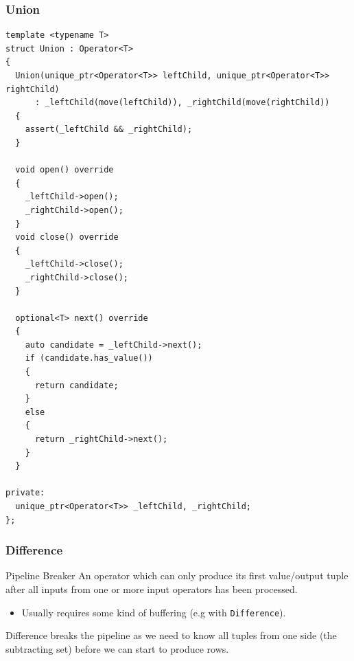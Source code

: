 \subsubsection{Union}
\begin{verbatim}
template <typename T>
struct Union : Operator<T>
{
  Union(unique_ptr<Operator<T>> leftChild, unique_ptr<Operator<T>> rightChild)
      : _leftChild(move(leftChild)), _rightChild(move(rightChild))
  {
    assert(_leftChild && _rightChild);
  }

  void open() override
  {
    _leftChild->open();
    _rightChild->open();
  }
  void close() override
  {
    _leftChild->close();
    _rightChild->close();
  }

  optional<T> next() override
  {
    auto candidate = _leftChild->next();
    if (candidate.has_value())
    {
      return candidate;
    }
    else
    {
      return _rightChild->next();
    }
  }

private:
  unique_ptr<Operator<T>> _leftChild, _rightChild;
};
\end{verbatim}

\subsubsection{Difference}

\begin{definitionbox}{Pipeline Breaker}
    An operator which can only produce its first value/output tuple after all inputs from one or more input operators has been processed.
    \begin{itemize}
        \item Usually requires some kind of buffering (e.g with \texttt{Difference}).
    \end{itemize}
\end{definitionbox}

Difference breaks the pipeline as we need to know all tuples from one side (the subtracting set) before we can start to produce rows.

